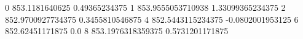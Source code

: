0 853.1181640625 0.49365234375
1 853.9555053710938 1.33099365234375
2 852.9700927734375 0.3455810546875
4 852.5443115234375 -0.0802001953125
6 852.62451171875 0.0
8 853.1976318359375 0.5731201171875
